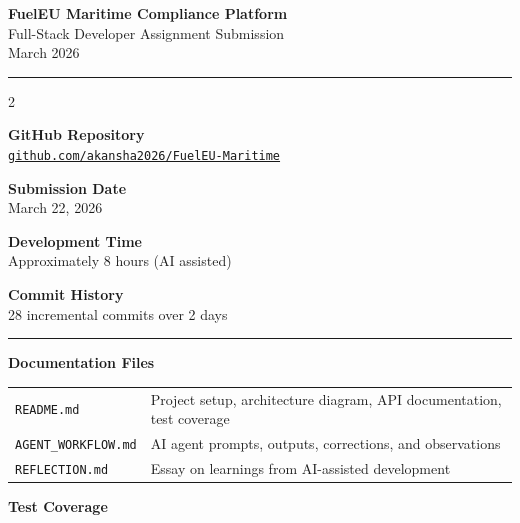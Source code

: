 \documentclass[10pt,a4paper]{article}
\begin{document}
\begin{center}
    {\LARGE\bfseries\color{darkgray} FuelEU Maritime Compliance Platform}\\[0.4em]
    {\large\color{lightgray} Full-Stack Developer Assignment Submission}\\[0.3em]
    {\small March 2026}
\end{center}

\vspace{0.8em}
\hrule
\vspace{0.8em}

\begin{multicols}{2}

\textbf{\color{darkgray}GitHub Repository}\\[0.2em]
\href{https://github.com/akansha2026/FuelEU-Maritime}{\texttt{github.com/akansha2026/FuelEU-Maritime}}

\vspace{0.6em}
\textbf{\color{darkgray}Submission Date}\\[0.2em]
March 22, 2026

\columnbreak

\textbf{\color{darkgray}Development Time}\\[0.2em]
Approximately 8 hours (AI assisted)

\vspace{0.6em}
\textbf{\color{darkgray}Commit History}\\[0.2em]
28 incremental commits over 2 days

\end{multicols}

\vspace{0.5em}
\hrule
\vspace{0.8em}

\textbf{\large\color{darkgray} Documentation Files}
\vspace{0.4em}

\begin{tabular}{@{}ll@{}}
\texttt{README.md} & Project setup, architecture diagram, API documentation, test coverage \\
\texttt{AGENT\_WORKFLOW.md} & AI agent prompts, outputs, corrections, and observations \\
\texttt{REFLECTION.md} & Essay on learnings from AI-assisted development \\
\end{tabular}

\vspace{0.8em}
\textbf{\large\color{darkgray} Test Coverage}
\vspace{0.4em}
\end{document}
